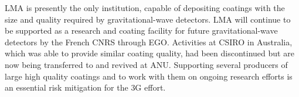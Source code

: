LMA is presently the only institution, capable of depositing coatings with the size and quality required by gravitational-wave detectors. LMA will continue to be supported as a research and coating facility for future gravitational-wave detectors by the French CNRS through EGO. Activities at CSIRO in Australia, which was able to provide similar coating quality, had been discontinued but are now being transferred to and revived at ANU. Supporting several producers of large high quality coatings and to work with them on ongoing research efforts is an essential risk mitigation for the \ac{3G} effort.







